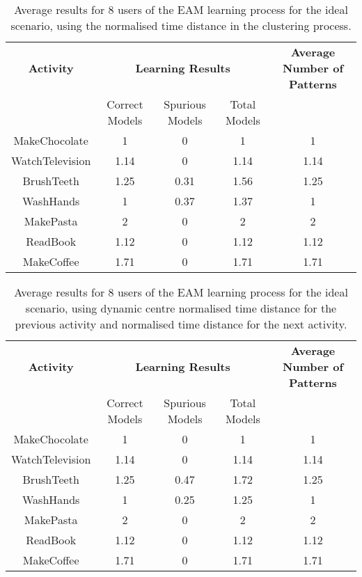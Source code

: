 \begin{table}[htbp]\scriptsize
  \begin{center}
        \begin{tabular}{ccccc}
            \hline            
            \textbf{Activity} & \multicolumn{3}{c}{\textbf{Learning Results}} & \textbf{Average Number of Patterns} \\
             & Correct Models & Spurious Models & Total Models & \\
            \hline
            MakeChocolate   & 1    & 0     & 1     & 1 \\
	    WatchTelevision & 1.14 & 0     & 1.14  & 1.14    \\
	    BrushTeeth      & 1.25 & 0.31  & 1.56  & 1.25 \\
	    WashHands       & 1    & 0.37  & 1.37  & 1 \\
	    MakePasta       & 2    & 0     & 2     & 2 \\
	    ReadBook        & 1.12 & 0     & 1.12  & 1.12  \\
	    MakeCoffee      & 1.71 & 0     & 1.71  & 1.71  \\
            \hline
        \end{tabular}
        \caption{Average results for 8 users of the EAM learning process for the ideal scenario, using the normalised time distance in the clustering process.}
        \label{tab-rp-ideal-t1}
    \end{center}
\end{table}



\begin{table}[htbp]\scriptsize
  \begin{center}
        \begin{tabular}{ccccc}
            \hline            
            \textbf{Activity} & \multicolumn{3}{c}{\textbf{Learning Results}} & \textbf{Average Number of Patterns} \\
             & Correct Models & Spurious Models & Total Models & \\
            \hline
            MakeChocolate   & 1    & 0     & 1     & 1 \\
	    WatchTelevision & 1.14 & 0     & 1.14  & 1.14    \\
	    BrushTeeth      & 1.25 & 0.47  & 1.72  & 1.25 \\
	    WashHands       & 1    & 0.25  & 1.25  & 1 \\
	    MakePasta       & 2    & 0     & 2     & 2 \\
	    ReadBook        & 1.12 & 0     & 1.12  & 1.12  \\
	    MakeCoffee      & 1.71 & 0     & 1.71  & 1.71  \\
            \hline
        \end{tabular}
        \caption{Average results for 8 users of the EAM learning process for the ideal scenario, using dynamic centre normalised time distance for the previous activity and normalised time distance for the next activity.}
        \label{tab-rp-ideal-t2}
    \end{center}
\end{table}

